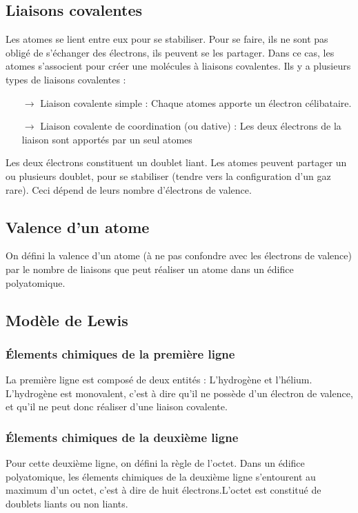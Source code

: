 \subsection{Liaisons covalentes}
Les atomes se lient entre eux pour se stabiliser. Pour se faire, ils ne sont pas obligé de s'échanger des électrons, ils peuvent se les partager. Dans ce cas, les atomes s'associent pour créer une molécules à liaisons covalentes. Ils y a plusieurs types de liaisons covalentes :
\begin{itemize}
 \item[$\rightarrow$] Liaison covalente simple : Chaque atomes apporte un électron célibataire.
 \item[$\rightarrow$] Liaison covalente de coordination (ou dative) : Les deux électrons de la liaison sont apportés par un seul atomes
\end{itemize}
Les deux électrons constituent un doublet liant. Les atomes peuvent partager un ou plusieurs doublet, pour se stabiliser (tendre vers la configuration d'un gaz rare). Ceci dépend de leurs nombre d'électrons de valence.
\subsection{Valence d'un atome}
\begin{de}
On défini la valence d'un atome (à ne pas confondre avec les électrons de valence) par le nombre de liaisons que peut réaliser un atome dans un édifice polyatomique.
\end{de}
\subsection{Modèle de Lewis}
\subsubsection{Élements chimiques de la première ligne}
La première ligne est composé de deux entités : L'hydrogène et l'hélium. L'hydrogène est monovalent, c'est à dire qu'il ne possède d'un électron de valence, et qu'il ne peut donc réaliser d'une liaison covalente.
\subsubsection{Élements chimiques de la deuxième ligne}
Pour cette deuxième ligne, on défini la règle de l'octet. Dans un édifice polyatomique, les élements chimiques de la deuxième ligne s'entourent au maximum d'un octet, c'est à dire de huit électrons.L'octet est constitué de doublets liants ou non liants.
